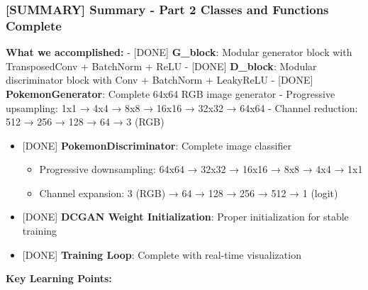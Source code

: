 \documentclass[11pt]{article}
\providecommand{\tightlist}{%
      \setlength{\itemsep}{0pt}\setlength{\parskip}{0pt}}
\begin{document}
    \subsubsection{{[}SUMMARY{]} Summary - Part 2 Classes and Functions
Complete}\label{summary-summary---part-2-classes-and-functions-complete}

\textbf{What we accomplished:} - {[}DONE{]} \textbf{G\_block}: Modular
generator block with TransposedConv + BatchNorm + ReLU - {[}DONE{]}
\textbf{D\_block}: Modular discriminator block with Conv + BatchNorm +
LeakyReLU - {[}DONE{]} \textbf{PokemonGenerator}: Complete 64x64 RGB
image generator - Progressive upsampling: 1x1 → 4x4 → 8x8 → 16x16 →
32x32 → 64x64 - Channel reduction: 512 → 256 → 128 → 64 → 3 (RGB)

\begin{itemize}
\tightlist
\item
  {[}DONE{]} \textbf{PokemonDiscriminator}: Complete image classifier

  \begin{itemize}
  \tightlist
  \item
    Progressive downsampling: 64x64 → 32x32 → 16x16 → 8x8 → 4x4 → 1x1
  \item
    Channel expansion: 3 (RGB) → 64 → 128 → 256 → 512 → 1 (logit)
  \end{itemize}
\item
  {[}DONE{]} \textbf{DCGAN Weight Initialization}: Proper initialization
  for stable training
\item
  {[}DONE{]} \textbf{Training Loop}: Complete with real-time
  visualization
\end{itemize}

\textbf{Key Learning Points:}
\end{document}
